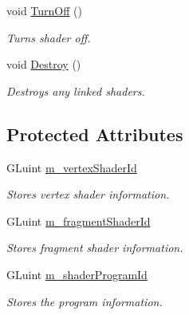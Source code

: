 \begin{CompactItemize}
void \hyperlink{class_shader_d94b005141a4ed31a3f4f801455e5590}{TurnOff} ()
\begin{CompactList}\small\item\em Turns shader off. \item\end{CompactList}\item 
void \hyperlink{class_shader_b6fc1a824cb122fcb0c902397e20f72f}{Destroy} ()
\begin{CompactList}\small\item\em Destroys any linked shaders. \item\end{CompactList}\end{CompactItemize}
\subsection*{Protected Attributes}
\begin{CompactItemize}
\item 
\hypertarget{class_shader_a4af62b65d664448eb086b7f1dee3c7c}{
GLuint \hyperlink{class_shader_a4af62b65d664448eb086b7f1dee3c7c}{m\_\-vertexShaderId}}
\label{class_shader_a4af62b65d664448eb086b7f1dee3c7c}

\begin{CompactList}\small\item\em Stores vertex shader information. \item\end{CompactList}\item 
\hypertarget{class_shader_7bad959241a440403646830cf23d6019}{
GLuint \hyperlink{class_shader_7bad959241a440403646830cf23d6019}{m\_\-fragmentShaderId}}
\label{class_shader_7bad959241a440403646830cf23d6019}

\begin{CompactList}\small\item\em Stores fragment shader information. \item\end{CompactList}\item 
\hypertarget{class_shader_b0449cf7ef18fc874a80156f11a781de}{
GLuint \hyperlink{class_shader_b0449cf7ef18fc874a80156f11a781de}{m\_\-shaderProgramId}}
\label{class_shader_b0449cf7ef18fc874a80156f11a781de}

\begin{CompactList}\small\item\em Stores the program information. \item\end{CompactList}\end{CompactItemize}


